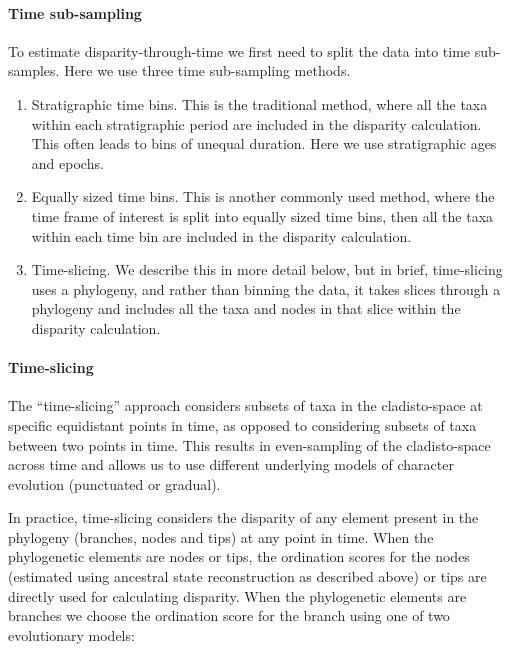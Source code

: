 \documentclass[12pt,a4paper]{article}
\begin{document}
\paragraph{Time sub-sampling} 
\label{time_sub-samples}

To estimate disparity-through-time we first need to split the data into time sub-samples.
Here we use three time sub-sampling methods.

\begin{enumerate}
  \item Stratigraphic time bins. This is the traditional method, where all the taxa within each stratigraphic period are included in the disparity calculation. This often leads to bins of unequal duration. Here we use stratigraphic ages and epochs.
  \item Equally sized time bins. This is another commonly used method, where the time frame of interest is split into equally sized time bins, then all the taxa within each time bin are included in the disparity calculation. 
  \item Time-slicing. We describe this in more detail below, but in brief, time-slicing uses a phylogeny, and rather than binning the data, it takes slices through a phylogeny and includes all the taxa and nodes in that slice within the disparity calculation. 
\end{enumerate}  

\paragraph{Time-slicing} 
\label{time_slicing}
The ``time-slicing'' approach considers subsets of taxa in the cladisto-space at specific equidistant points in time, as opposed to considering subsets of taxa between two points in time.
This results in even-sampling of the cladisto-space across time and allows us to use different underlying models of character evolution (punctuated or gradual). 


In practice, time-slicing considers the disparity of any element present in the phylogeny (branches, nodes and tips) at any point in time.
When the phylogenetic elements are nodes or tips, the ordination scores for the nodes (estimated using ancestral state reconstruction as described above) or tips are directly used for calculating disparity.
When the phylogenetic elements are branches we choose the ordination score for the branch using one of two evolutionary models:
\end{document}
